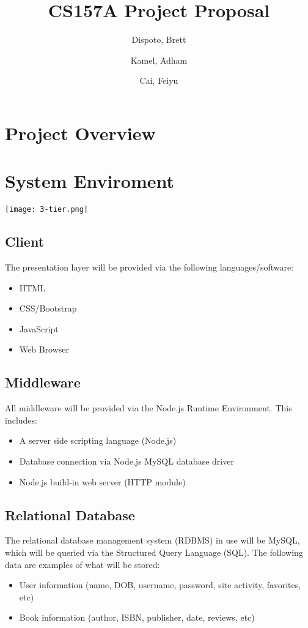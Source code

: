 \documentclass[titlepage]{article}
\author{ Dispoto, Brett\\
	\and
	Kamel, Adham\\
	\and
	Cai, Feiyu\\
}
\title{CS157A Project Proposal}
\begin{document}
	\maketitle
	
	\section{Project Overview}	
	



	\section{System Enviroment}
	
	\texttt{[image: 3-tier.png]}
	
	\subsection{Client}
		The presentation layer will be provided via the following languages/software:
	\begin{itemize}
		\item HTML
		\item CSS/Bootstrap
		\item JavaScript
		\item Web Browser 
	\end{itemize}
	\subsection{Middleware}
		All middleware will be provided via the Node.js Runtime Environment. This includes: 
	\begin{itemize}
		\item A server side scripting language (Node.js)
		\item Database connection via Node.js MySQL database driver	
		\item Node.js build-in web server (HTTP module)
	\end{itemize}
	
	\subsection{Relational Database}
		The relational database management system (RDBMS) in use will be MySQL, which will be queried via the Structured Query Language (SQL). The following data are examples of what will be stored:
	\begin{itemize}
		\item User information (name, DOB, username, password, site activity, favorites, etc)
		\item Book information (author, ISBN, publisher, date, reviews, etc)
	\end{itemize}
\end{document}
